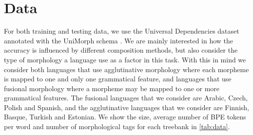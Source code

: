 \documentclass[11pt]{article}
\newcommand\citep{\cite}
\begin{document}
    \section{Data}
    
            For both training and testing data, we use the Universal
     Dependencies dataset \citep{nivre2018} annotated with the
     UniMorph schema \citep{mccarthy2018marrying}.  We are mainly
     interested in how the accuracy is influenced by different
     composition methods, but also consider the type of morphology a
     language use as a factor in this task.
%
    With this in mind we consider both
     languages that use agglutinative morphology where each morpheme
     is mapped to one and only one grammatical feature, and
     languages that use fusional morphology where a morpheme may be
     mapped to one or more grammatical features. 
%
%
           	The fusional languages that we consider are Arabic, Czech,
     Polish and Spanish, and the agglutinative languages that we
     consider are Finnish, Basque, Turkish and Estonian.  We show the
     size, average number of BPE tokens per word and number of
     morphological tags for each treebank in \cref{tab:data}.
    
\end{document}
